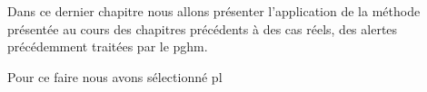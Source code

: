Dans ce dernier chapitre nous allons présenter l'application de la
méthode présentée au cours des chapitres précédents à des cas réels,
des alertes précédemment traitées par le \ac{pghm}.

Pour ce faire nous avons sélectionné pl

